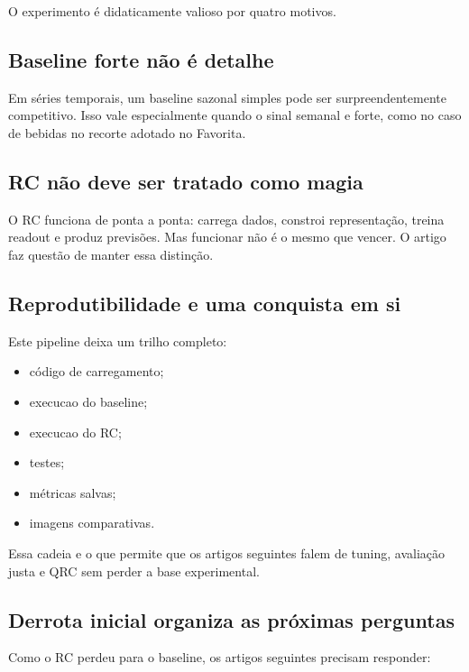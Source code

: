 \documentclass[12pt]{article}
\providecommand{\tightlist}{%
              \setlength{\itemsep}{0pt}\setlength{\parskip}{0pt}}
\begin{document}
O experimento é didaticamente valioso por quatro motivos.

\subsection{Baseline forte não é detalhe}\label{81-baseline-forte-nuxe3o-uxe9-detalhe}

Em séries temporais, um baseline sazonal simples pode ser surpreendentemente competitivo. Isso vale especialmente quando o sinal semanal e forte, como no caso de bebidas no recorte adotado no Favorita.

\subsection{RC não deve ser tratado como magia}\label{82-rc-nuxe3o-deve-ser-tratado-como-magia}

O RC funciona de ponta a ponta: carrega dados, constroi representação, treina readout e produz previsões. Mas funcionar não é o mesmo que vencer. O artigo faz questão de manter essa distinção.

\subsection{Reprodutibilidade e uma conquista em si}\label{83-reprodutibilidade-e-uma-conquista-em-si}

Este pipeline deixa um trilho completo:

\begin{itemize}
\tightlist
\item
  código de carregamento;
\item
  execucao do baseline;
\item
  execucao do RC;
\item
  testes;
\item
  métricas salvas;
\item
  imagens comparativas.
\end{itemize}

Essa cadeia e o que permite que os artigos seguintes falem de tuning, avaliação justa e QRC sem perder a base experimental.

\subsection{Derrota inicial organiza as próximas perguntas}\label{84-derrota-inicial-organiza-as-pruxf3ximas-perguntas}

Como o RC perdeu para o baseline, os artigos seguintes precisam responder:
\end{document}
